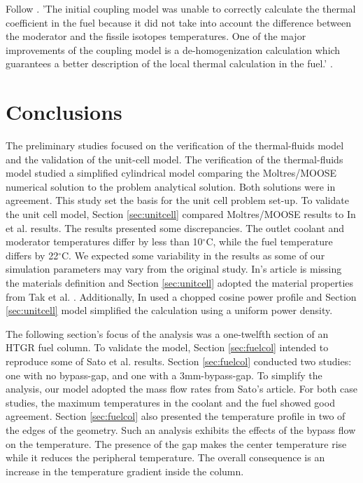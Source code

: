 

Follow \cite{j_ortensi_initial_2012}.
'The initial coupling model was unable to correctly calculate the thermal coefficient in the fuel because it did not take into account the difference between the moderator and the fissile isotopes temperatures.
One of the major improvements of the coupling model is a de-homogenization calculation which guarantees a better description of the local thermal calculation in the fuel.' \cite{damian_vhtr_2008}.


\section{Conclusions}

The preliminary studies focused on the verification of the thermal-fluids model and the validation of the unit-cell model.
The verification of the thermal-fluids model studied a simplified cylindrical model comparing the Moltres/MOOSE numerical solution to the problem analytical solution.
Both solutions were in agreement.
This study set the basis for the unit cell problem set-up.
To validate the unit cell model, Section \ref{sec:unitcell} compared Moltres/MOOSE results to In et al. \cite{in_three-dimensional_2006} results.
The results presented some discrepancies.
The outlet coolant and moderator temperatures differ by less than 10$^{\circ}$C, while the fuel temperature differs by 22$^{\circ}$C.
We expected some variability in the results as some of our simulation parameters may vary from the original study.
In's article is missing the materials definition and Section \ref{sec:unitcell} adopted the material properties from Tak et al. \cite{tak_numerical_2008}.
Additionally, In used a chopped cosine power profile and Section \ref{sec:unitcell} model simplified the calculation using a uniform power density.

The following section's focus of the analysis was a one-twelfth section of an HTGR fuel column.
To validate the model, Section \ref{sec:fuelcol} intended to reproduce some of Sato et al. \cite{sato_computational_2010} results.
Section \ref{sec:fuelcol} conducted two studies: one with no bypass-gap, and one with a 3mm-bypass-gap.
To simplify the analysis, our model adopted the mass flow rates from Sato's article.
For both case studies, the maximum temperatures in the coolant and the fuel showed good agreement.
Section \ref{sec:fuelcol} also presented the temperature profile in two of the edges of the geometry.
Such an analysis exhibits the effects of the bypass flow on the temperature.
The presence of the gap makes the center temperature rise while it reduces the peripheral temperature.
The overall consequence is an increase in the temperature gradient inside the column.

